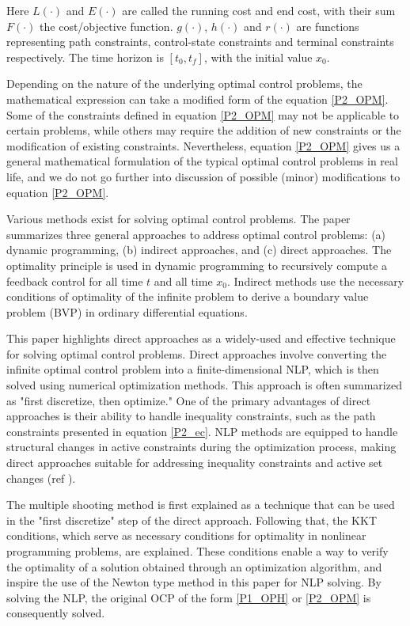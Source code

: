 \documentclass  [
  paper    = a4,
  BCOR     = 10mm,
  twoside,
  fontsize = 12pt,
  fleqn,
  toc      = bibnumbered,
  toc      = listofnumbered,
  numbers  = noendperiod,
  headings = normal,
  listof   = leveldown,
  version  = 3.03
]                                       {scrreprt}
\newcommand{\<}{\langle}
\renewcommand{\>}{\rangle}
\begin{document}
Here $L(\cdot)$ and $E(\cdot)$ are called the running cost and end cost, with their sum $F(\cdot)$ the cost/objective function. $g(\cdot)$, $h(\cdot)$ and $r(\cdot)$ are functions representing path constraints, control-state constraints and terminal constraints respectively. The time horizon is $[t_0, t_f]$, with the initial value $x_0$.   

Depending on the nature of the underlying optimal control problems, the mathematical expression can take a modified form of the equation \ref{P2_OPM}. Some of the constraints defined in equation \ref{P2_OPM} may not be applicable to certain problems, while others may require the addition of new constraints or the modification of existing constraints. Nevertheless, equation \ref{P2_OPM} gives us a general mathematical formulation of the typical optimal control problems in real life, and we do not go further into discussion of possible (minor) modifications to equation \ref{P2_OPM}. 

Various methods exist for solving optimal control problems. The paper \cite{MHHP05} summarizes three general approaches to address optimal control problems: (a) dynamic programming, (b) indirect approaches, and (c) direct approaches. The optimality principle is used in dynamic programming to recursively compute a feedback control for all time $t$ and all time $x_0$. Indirect methods use the necessary conditions of optimality of the infinite problem to derive a boundary value problem (BVP) in ordinary differential equations.


This paper highlights direct approaches as a widely-used and effective technique for solving optimal control problems. Direct approaches involve converting the infinite optimal control problem into a finite-dimensional NLP, which is then solved using numerical optimization methods. This approach is often summarized as "first discretize, then optimize." One of the primary advantages of direct approaches is their ability to handle inequality constraints, such as the path constraints presented in equation \ref{P2_ec}. NLP methods are equipped to handle structural changes in active constraints during the optimization process, making direct approaches suitable for addressing inequality constraints and active set changes (ref \cite{MHHP05}).

The multiple shooting method is first explained as a technique that can be used in the "first discretize" step of the direct approach. Following that, the KKT conditions, which serve as necessary conditions for optimality in nonlinear programming problems, are explained. These conditions enable a way to verify the optimality of a solution obtained through an optimization algorithm, and inspire the use of the Newton type method in this paper for NLP solving. By solving the NLP, the original OCP of the form \ref{P1_OPH} or \ref{P2_OPM} is consequently solved.
\end{document}
